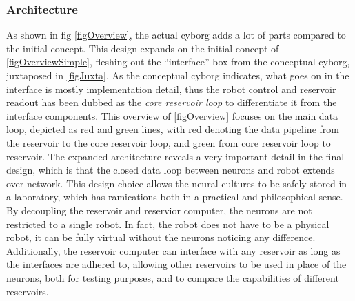 \subsubsection{Architecture}
As shown in fig \ref{figOverview}, the actual cyborg adds a lot of parts
compared to the initial concept.
This design expands on the initial concept of \ref{figOverviewSimple}, fleshing
out the ``interface'' box from the conceptual cyborg, juxtaposed in
\ref{figJuxta}.
As the conceptual cyborg indicates, what goes on in the interface is mostly
implementation detail, thus the robot control and reservoir readout has been
dubbed as the \emph{core reservoir loop} to differentiate it from the interface
components.
This overview of \ref{figOverview} focuses on the main data loop, depicted as
red and green lines, with red denoting the data pipeline from the reservoir to
the core reservoir loop, and green from core reservoir loop to reservoir.
The expanded architecture reveals a very important detail in the final design,
which is that the closed data loop between neurons and robot extends over
network. 
This design choice allows the neural cultures to be safely stored in a
laboratory, which has ramications both in a practical and philosophical sense.
By decoupling the reservoir and reservior computer, the neurons are not
restricted to a single robot.
In fact, the robot does not have to be a physical robot, it can be fully virtual
without the neurons noticing any difference.
Additionally, the reservoir computer can interface with any reservoir as long as
the interfaces are adhered to, allowing other reservoirs to be used in place of
the neurons, both for testing purposes, and to compare the capabilities of
different reservoirs.

